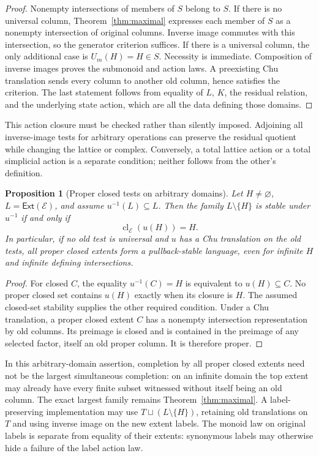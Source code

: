 \documentclass[11pt]{article}
\newtheorem{proposition}[theorem]{Proposition}
\theoremstyle{definition}
\newcommand{\Ext}{\mathsf{Ext}}
\newcommand{\cl}{\operatorname{cl}}
\begin{document}
\begin{proof}
Nonempty intersections of members of $S$ belong to $S$. If there is no
universal column, Theorem~\ref{thm:maximal} expresses each member of $S$
as a nonempty intersection of original columns. Inverse image commutes
with this intersection, so the generator criterion suffices. If there is
a universal column, the only additional case is $U_m(H)=H\in S$.
Necessity is immediate. Composition of inverse images proves the
submonoid and action laws. A preexisting Chu translation sends every
column to another old column, hence satisfies the criterion. The last
statement follows from equality of $L$, $K$, the residual relation, and
the underlying state action, which are all the data defining those domains.
\end{proof}

This action closure must be checked rather than silently imposed.
Adjoining all inverse-image tests for arbitrary operations can preserve
the residual quotient while changing the lattice or complex. Conversely,
a total lattice action or a total simplicial action is a separate
condition; neither follows from the other's definition.


\begin{proposition}[Proper closed tests on arbitrary domains]
\label{prop:proper-action}
Let $H\ne\varnothing$, $L=\Ext(\mathcal E)$, and assume $u^{-1}(L)\subseteq L$.
Then the family $L\setminus\{H\}$ is stable under $u^{-1}$ if and only if
\[
 \cl_{\mathcal E}(u(H))=H.
\]
In particular, if no old test is universal and $u$ has a Chu translation
on the old tests, all proper closed extents form a pullback-stable language,
even for infinite $H$ and infinite defining intersections.
\end{proposition}
\begin{proof}
For closed $C$, the equality $u^{-1}(C)=H$ is equivalent to $u(H)\subseteq C$.
No proper closed set contains $u(H)$ exactly when its closure is $H$.
The assumed closed-set stability supplies the other required condition.
Under a Chu translation, a proper closed extent $C$ has a nonempty
intersection representation by old columns. Its preimage is closed and is
contained in the preimage of any selected factor, itself an old proper
column. It is therefore proper.
\end{proof}

In this arbitrary-domain assertion, completion by all proper closed extents
need not be the largest simultaneous completion: on an infinite domain the
top extent may already have every finite subset witnessed without itself
being an old column. The exact largest family remains
Theorem~\ref{thm:maximal}. A label-preserving implementation may use
$T\sqcup(L\setminus\{H\})$, retaining old translations on $T$ and using
inverse image on the new extent labels. The monoid law on original labels
is separate from equality of their extents: synonymous labels may otherwise
hide a failure of the label action law.
\end{document}

